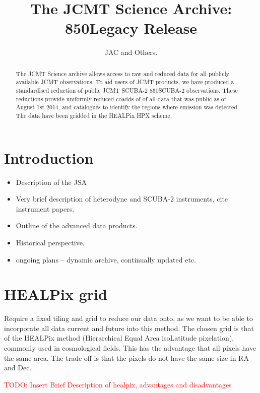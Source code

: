 \documentclass[usenatbib]{mn2e}
\title{The JCMT Science Archive: 850\micron Legacy Release}
\author{JAC and Others.}
\newcommand{\todo}[1]{\textcolor{red}{TODO: #1}}
\begin{document}
\maketitle

\begin{abstract}

  The JCMT Science archive allows access to raw and reduced data for
  all publicly available JCMT observations. To aid users of JCMT
  products, we have produced a standardised reduction of public JCMT
  SCUBA-2 850\micron SCUBA-2 observations. These reductions provide
  uniformly reduced coadds of of all data that was public as of August
  1st 2014, and catalogues to identify the regions where emission was
  detected. The data have been gridded in the HEALPix HPX scheme.
\end{abstract}

\section{Introduction}
\begin{itemize}
\item Description of the JSA \citep{2015Economou}
\item Very brief description of heterodyne and SCUBA-2 instruments, cite instrument papers. \citep{2013MNRAS.430.2513H} \citep{2009MNRAS.399.1026B}
\item Outline of the advanced data products. \citep{2014SPIE.9152E..2JB}
\item Historical perspective. \citep{2011ASPC..442..203E}
\item ongoing plans -- dynamic archive, continually updated etc.
\end{itemize}



\section{HEALPix grid }
Require a fixed tiling and grid to reduce our data onto, as we want to be able to
incorporate all data current and future into this method. The chosen
grid is that of the HEALPix method (Hierarchical Equal Area
isoLatitude pixelation), commonly used in cosmological fields. This
has the advantage that all pixels have the same area. The trade off is
that the pixels do not have the same size in RA and Dec.

\todo{Insert Brief Description of healpix, advantages and
  disadvantages}
\end{document}
